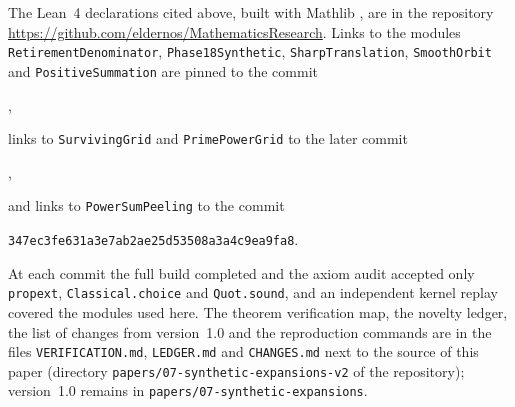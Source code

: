 \documentclass[11pt]{article}
\newcommand{\ttt}[1]{\texttt{#1}}
\newcommand{\phaseXXIcommit}{347ec3fe631a3e7ab2ae25d53508a3a4c9ea9fa8}
\begin{document}
The Lean~4 \cite{Lean4} declarations cited above, built with Mathlib \cite{Mathlib}, are in the
repository \url{https://github.com/eldernos/MathematicsResearch}. Links to the modules
\ttt{RetirementDenominator}, \ttt{Phase18Synthetic}, \ttt{SharpTranslation}, \ttt{SmoothOrbit} and
\ttt{PositiveSummation} are pinned to the commit
\begin{center}\ttt{\leancommit},\end{center}
links to \ttt{SurvivingGrid} and \ttt{PrimePowerGrid} to the later commit
\begin{center}\ttt{\phaseXIXcommit},\end{center}
and links to \ttt{PowerSumPeeling} to the commit
\begin{center}\ttt{\phaseXXIcommit}.\end{center}
At each commit the full build completed and the axiom audit accepted only \ttt{propext},
\ttt{Classical.choice} and \ttt{Quot.sound}, and an independent kernel replay covered the modules used
here. The theorem verification map, the novelty ledger, the list of changes from version~1.0 and the
reproduction commands are in the files \ttt{VERIFICATION.md}, \ttt{LEDGER.md} and \ttt{CHANGES.md} next to
the source of this paper (directory \ttt{papers/07-synthetic-expansions-v2} of the repository); version~1.0
remains in \ttt{papers/07-synthetic-expansions}.
\end{document}
